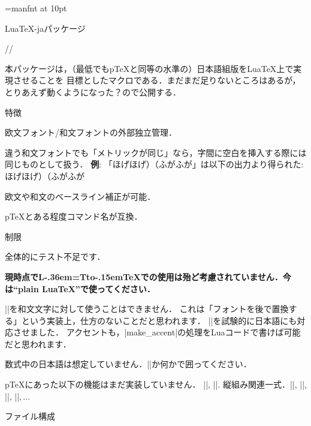 
\overfullrule=0pt
\def\LaTeX{L\kern-.36em\setbox0=\hbox{T}\vbox to\ht0{\hbox{\sx A}\vss}\kern-.15em\TeX}
\font\mff=manfnt at 10pt
\def\mf{{\mff META{\rm\-}FONT}}
\def\textfontii{\the\textfont2 }
\def\AmS{{\textfontii A\kern-.1667em\lower.5ex\hbox{M}\kern-.125emS}}
\def\UPSILON{\char'7}%
\def\XyM{X\kern-.30em\smash{\raise.50ex\hbox{\UPSILON}}\kern-.30em{M}}%
\def\XyMTeX{\XyM\kern-.1em\TeX}%


\centerline{\big Lua\TeX-jaパッケージ}\bigskip
\centerline{\large\the\year/\the\month/\the\day}\medskip

\bigskip

本パッケージは，（最低でもp\TeX と同等の水準の）日本語組版をLua\TeX 上で実現させることを
目標としたマクロである．まだまだ足りないところはあるが，とりあえず動くようになった？ので公開する． 


\beginparagraph 特徴

\item 欧文フォント/和文フォントの外部独立管理．
\item 違う和文フォントでも「メトリックが同じ」なら，字間に空白を挿入する際には同じものとして扱う．
{\bf 例}: 「ほげほげ）{\gt （ふがふが}」は以下の出力より得られた:
\begintt
ほげほげ）{\gt （ふがふが}
\endtt
\item 欧文や和文のベースライン補正が可能．
\item p\TeX とある程度コマンド名が互換．
\enditem

\beginparagraph 制限

\item 全体的にテスト不足です．
\item {\bf 現時点で\LaTeX での使用は殆ど考慮されていません．今は``plain Lua\TeX''で使ってください．}
\item |\accent|を和文文字に対して使うことはできません．
これは「フォントを後で置換する」という実装上，仕方のないことだと思われます．
{\small|\/|を試験的に日本語にも対応させました．
アクセントも，|make_accent|の処理をLuaコードで書けば可能だと思われます．}
\item 数式中の日本語は想定していません．|\hbox|か何かで囲ってください．
\item p\TeX にあった以下の機能はまだ実装していません．
\itemitem |\showmode|, |\jfam|.
\itemitem 縦組み関連一式．|\tate|, |\tfont|, |\tbaselineshift|, |\dtou|,$\,\ldots$

\enditem


\beginparagraph ファイル構成


